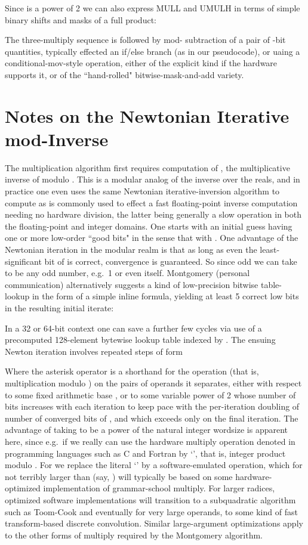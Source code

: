 \documentclass{article}
\begin{document}
Since  is a power of 2 we can also express MULL and UMULH in terms of simple binary shifts and masks of a full product:

The three-multiply sequence  is followed by mod- subtraction of a pair of -bit quantities, typically effected an if/else branch (as in our pseudocode), or uaing a conditional-mov-style operation, either of the explicit kind if the hardware supports it, or of the ``hand-rolled" bitwise-mask-and-add variety.



\section{Notes on the Newtonian Iterative mod-Inverse}
\label{sect:modinv}

The multiplication algorithm first requires computation of , the multiplicative inverse of  modulo . This is a modular analog of the inverse over the reals, and in practice one even uses the same Newtonian iterative-inversion algorithm to compute  as is commonly used to effect a fast floating-point inverse computation needing no hardware division, the latter being generally a slow operation in both the floating-point and integer domains. One starts with an initial guess  having one or more low-order ``good bits" in the sense that  with . One advantage of the Newtonian iteration in the modular realm is that as long as even the least-significant bit of  is correct, convergence is guaranteed. So since  odd we can take  to be any odd number, e.g.~1 or even  itself. Montgomery (personal communication) alternatively suggests a kind of low-precision bitwise table-lookup in the form of a simple inline formula, yielding at least 5 correct low bits in the resulting initial iterate:

In a 32 or 64-bit context one can save a further few cycles via use of a precomputed 128-element bytewise lookup table indexed by . The ensuing Newton iteration involves repeated steps of form

Where the asterisk operator is a shorthand for the  operation (that is, multiplication modulo ) on the pairs of operands it separates, either with respect to some fixed arithmetic base , or to some variable power of 2 whose number of bits increases with each iteration to keep pace with the per-iteration doubling of number of converged bits of , and which exceeds  only on the final iteration. The advantage of taking  to be a power of the natural integer wordsize is apparent here, since e.g.~if  we really can use the hardware multiply operation denoted in programming languages such as C and Fortran by `', that is, integer product modulo . For  we replace the literal `' by a software-emulated  operation, which for  not terribly larger than  (say, ) will typically be based on some hardware-optimized implementation of grammar-school multiply. For larger radices, optimized software implementations will transition to a subquadratic algorithm such as Toom-Cook and eventually for very large operands, to some kind of fast transform-based discrete convolution. Similar large-argument optimizations apply to the other forms of multiply required by the Montgomery algorithm.
\end{document}
